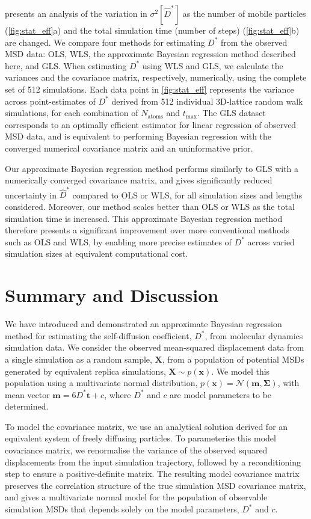 \documentclass[reprint,superscriptaddress,nobibnotes,amsmath,amssymb,aps,prx,hidelinks]{revtex4-2}
\newcommand{\oMSD}{\ensuremath{\bm{x}}}
\newcommand{\model}{\bm{m}}
\newcommand{\Dest}{\ensuremath{\widehat{D}^*}}
\newcommand{\D}{\ensuremath{D^*}}
\newcommand{\var}[1]{\ensuremath{\sigma^2[#1]}}
\begin{document}
 presents an analysis of the variation in $\var{\Dest}$ as the number of mobile particles (\cref{fig:stat_eff}a) and the total simulation time (number of steps) (\cref{fig:stat_eff}b) are changed.
We compare four methods for estimating $\D$ from the observed MSD data: OLS, WLS, the approximate Bayesian regression method described here, and GLS.
When estimating $\D$ using WLS and GLS, we calculate the variances and the covariance matrix, respectively, numerically, using the complete set of \num{512} simulations.
Each data point in \cref{fig:stat_eff} represents the variance across point-estimates of $\D$ derived from \num{512} individual 3D-lattice random walk simulations, for each combination of $N_\mathrm{atoms}$ and $t_\mathrm{max}$.
The GLS dataset corresponds to an optimally efficient estimator for linear regression of observed MSD data, and is equivalent to performing Bayesian regression with the converged numerical covariance matrix and an uninformative prior.

Our approximate Bayesian regression method performs similarly to GLS with a numerically converged covariance matrix, and gives significantly reduced uncertainty in $\Dest$ compared to OLS or WLS, for all simulation sizes and lengths considered.
Moreover, our method scales better than OLS or WLS as the total simulation time is increased.
This approximate Bayesian regression method therefore presents a significant improvement over more conventional methods such as OLS and WLS, by enabling more precise estimates of $\D$ across varied simulation sizes at equivalent computational cost.

\section{Summary and Discussion}

We have introduced and demonstrated an approximate Bayesian regression method for estimating the self-diffusion coefficient, $\D$, from molecular dynamics simulation data.
We consider the observed mean-squared displacement data from a single simulation as a random sample, $\bm{X}$, from a population of potential MSDs generated by equivalent replica simulations, $\bm{X}\sim p(\oMSD)$.
We model this population using a multivariate normal distribution, $p(\oMSD) = \mathcal{N}(\model, \mathbf{\Sigma})$, with mean vector $\model = 6\D\bm{t} + c$, where $\D$ and $c$ are model parameters to be determined.

To model the covariance matrix, we use an analytical solution derived for an equivalent system of freely diffusing particles.
To parameterise this model covariance matrix, we renormalise the variance of the observed squared displacements from the input simulation trajectory, followed by a reconditioning step to ensure a positive-definite matrix.
The resulting model covariance matrix preserves the correlation structure of the true simulation MSD covariance matrix, and gives a multivariate normal model for the population of observable simulation MSDs that depends solely on the model parameters, $\D$ and $c$.
\end{document}
